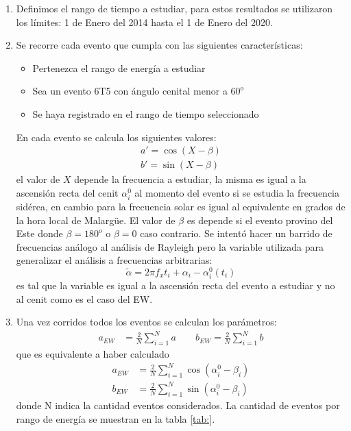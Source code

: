 \begin{enumerate}
    \item Definimos el rango de tiempo a estudiar, para estos resultados se utilizaron los límites: 1 de Enero del 2014 hasta el 1 de Enero del 2020.
    \item Se recorre cada evento que cumpla con las siguientes características:
     \begin{itemize}
        \item Pertenezca el rango de energía a estudiar
        \item Sea un evento 6T5 con ángulo cenital menor a $60^o$
        \item Se haya registrado en el rango de tiempo seleccionado
    \end{itemize}
    En cada evento se calcula los siguientes valores:
    \begin{align}
        a' = \cos(X - \beta)\\
        b' = \sin(X - \beta)
    \end{align}
    el valor de $X$ depende la frecuencia a estudiar, la misma es igual a la ascensión recta del cenit $\alpha^0_i$ al momento del evento  si se estudia la frecuencia sidérea, en cambio para la frecuencia solar es igual al equivalente en grados de la hora local de Malargüe. El valor de $\beta$ es depende si el evento provino del Este donde $\beta=180^o$ o $\beta=0$ caso contrario.
    Se intentó hacer un barrido de frecuencias análogo al análisis de Rayleigh pero la variable utilizada para generalizar el análisis a frecuencias arbitrarias:
    \begin{equation}
        \tilde{\alpha} = 2\pi f_x t_i + \alpha_i - \alpha_i^0(t_i) \label{ra_mod}
      \end{equation}
    es tal que la variable es igual a la ascensión recta del evento a estudiar y no al cenit como es el caso del EW.
    \item Una vez corridos todos los  eventos se calculan los parámetros:
    \begin{align*}
        a_{EW} &= \frac{2}{N} \sum^N_{i=1} a \qquad
        b_{EW} = \frac{2}{N} \sum^N_{i=1} b
    \end{align*}
    que es equivalente a haber calculado
    \begin{align*}
        a_{EW} &= \frac{2}{N} \sum^N_{i=1} \cos(\alpha^0_i - \beta_i)\\
        b_{EW} &= \frac{2}{N} \sum^N_{i=1} \sin(\alpha^0_i - \beta_i)
    \end{align*}
    donde N indica la cantidad eventos considerados. La cantidad de eventos por rango de energía se muestran en la tabla \ref{tab:}.


\end{enumerate}
